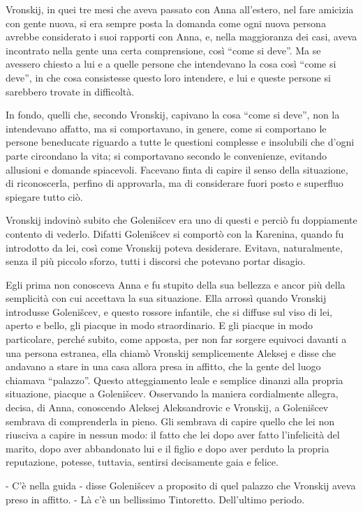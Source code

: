 Vronskij, in quei tre mesi che aveva passato con Anna all'estero, nel fare amicizia con gente nuova, si era sempre posta la domanda come ogni nuova persona avrebbe considerato i suoi rapporti con Anna, e, nella maggioranza dei casi, aveva incontrato nella gente una certa comprensione, così ``come si deve''. Ma se avessero chiesto a lui e a quelle persone che intendevano la cosa così ``come si deve'', in che cosa consistesse questo loro intendere, e lui e queste persone si sarebbero trovate in difficoltà. 

In fondo, quelli che, secondo Vronskij, capivano la cosa ``come si deve'', non la intendevano affatto, ma si comportavano, in genere, come si comportano le persone beneducate riguardo a tutte le questioni complesse e insolubili che d'ogni parte circondano la vita; si comportavano secondo le convenienze, evitando allusioni e domande spiacevoli. Facevano finta di capire il senso della situazione, di riconoscerla, perfino di approvarla, ma di considerare fuori posto e superfluo spiegare tutto ciò. 

Vronskij indovinò subito che Golenišcev era uno di questi e perciò fu doppiamente contento di vederlo. Difatti Golenišcev si comportò con la Karenina, quando fu introdotto da lei, così come Vronskij poteva desiderare. Evitava, naturalmente, senza il più piccolo sforzo, tutti i discorsi che potevano portar disagio. 

Egli prima non conosceva Anna e fu stupito della sua bellezza e ancor più della semplicità con cui accettava la sua situazione. Ella arrossì quando Vronskij introdusse Golenišcev, e questo rossore infantile, che si diffuse sul viso di lei, aperto e bello, gli piacque in modo straordinario. E gli piacque in modo particolare, perché subito, come apposta, per non far sorgere equivoci davanti a una persona estranea, ella chiamò Vronskij semplicemente Aleksej e disse che andavano a stare in una casa allora presa in affitto, che la gente del luogo chiamava ``palazzo''. Questo atteggiamento leale e semplice dinanzi alla propria situazione, piacque a Golenišcev. Osservando la maniera cordialmente allegra, decisa, di Anna, conoscendo Aleksej Aleksandrovic e Vronskij, a Golenišcev sembrava di comprenderla in pieno. Gli sembrava di capire quello che lei non riusciva a capire in nessun modo: il fatto che lei dopo aver fatto l'infelicità del marito, dopo aver abbandonato lui e il figlio e dopo aver perduto la propria reputazione, potesse, tuttavia, sentirsi decisamente gaia e felice. 

- C'è nella guida - disse Golenišcev a proposito di quel palazzo che Vronskij aveva preso in affitto. - Là c'è un bellissimo Tintoretto. Dell'ultimo periodo. 

